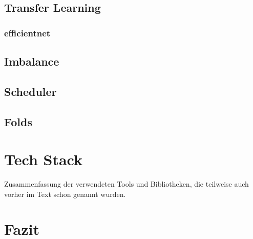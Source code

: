 \documentclass[11pt, a4paper]{article}
\begin{document}
\subsection{Transfer Learning}

\subsubsection{efficientnet}

\subsection{Imbalance}

\subsection{Scheduler}

\subsection{Folds}

\section{Tech Stack}
Zusammenfassung der verwendeten Tools und Bibliotheken, die teilweise auch vorher im Text schon genannt wurden.

\section{Fazit}
\end{document}
